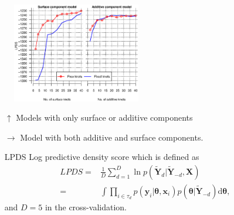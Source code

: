 \documentclass[10pt]{beamer}
\begin{document}
\begin{frame}[plain]
  \begin{multicols}{2}
    \begin{center}
      \begin{figure}
        \includegraphics[width=0.5\textwidth]{RajanLPDS_SurfaceBesideAdditive}
      \end{figure}
    \end{center}
    \begin{enumerate}
    \item [$\uparrow$] \tiny{Models with only surface or additive components}
    \item [$\rightarrow$] \tiny{Model with both additive and surface
        components.}
    \item [LPDS] \tiny {Log predictive density score which is defined as
        \[
        \begin{split}
          LPDS=&\frac{1}{D}\sum\nolimits_{d=1}^{D}\ln
          p(\tilde{\bm{Y}}_{d}|\tilde{\bm{Y}}_{-d},\bm{X})\\
          =&\int\!\prod\nolimits_{i\in\tau_{d}}p(\bm{y}_{i}|\bm{\theta},
          \bm{x}_{i})p(\bm{\theta}|\tilde{\bm{Y}}_{-d})\mathrm{d}\bm{\theta},
        \end{split}
        \]
        and $D=5$ in the cross-validation.}
    \end{enumerate}


\end{multicols}
\end{frame}
\end{document}
